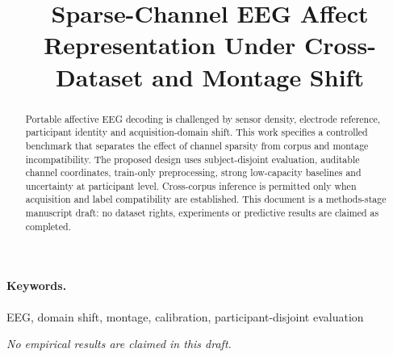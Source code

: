 \documentclass[11pt,a4paper]{article}
\title{Sparse-Channel EEG Affect Representation Under Cross-Dataset and Montage Shift}
\author{}
\begin{document}
\maketitle
\begin{abstract}
Portable affective EEG decoding is challenged by sensor density, electrode reference, participant identity and acquisition-domain shift. This work specifies a controlled benchmark that separates the effect of channel sparsity from corpus and montage incompatibility. The proposed design uses subject-disjoint evaluation, auditable channel coordinates, train-only preprocessing, strong low-capacity baselines and uncertainty at participant level. Cross-corpus inference is permitted only when acquisition and label compatibility are established. This document is a methods-stage manuscript draft: no dataset rights, experiments or predictive results are claimed as completed.
\end{abstract}
\paragraph{Keywords.}
EEG, domain shift, montage, calibration, participant-disjoint evaluation

\noindent\textit{No empirical results are claimed in this draft.}






\end{document}
